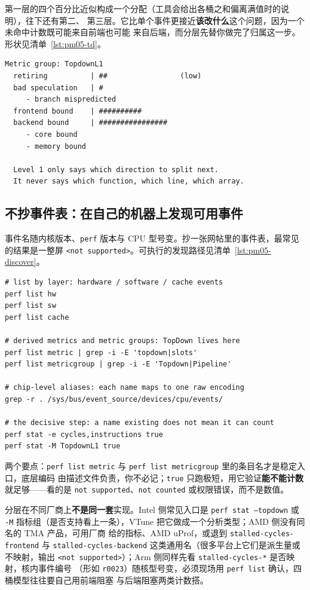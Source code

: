 \documentclass[12pt,a4paper,fontset=fandol]{ctexbook}
\newcommand{\Tp}[1]{\texttt{#1}}
\newcommand{\Bk}{\discretionary{}{}{}}
\begin{document}
第一层的四个百分比近似构成一个分配（工具会给出各桶之和偏离满值时的说明），往下还有第二、
第三层。它比单个事件更接近\textbf{该改什么}这个问题，因为一个未命中计数既可能来自前端也可能
来自后端，而分层先替你做完了归属这一步。形状见清单~\ref{lst:pm05-td}。

\begin{lstlisting}[style=outstyle, label={lst:pm05-td},
  caption={形态示意：TopDown 第一层的输出形状（非实测值，条形长度只表示相对高低）}]
  Metric group: TopdownL1
  retiring          | ##                 (low)
  bad speculation   | #
     - branch mispredicted
  frontend bound    | ##########
  backend bound     | ################
     - core bound
     - memory bound

  Level 1 only says which direction to split next.
  It never says which function, which line, which array.
\end{lstlisting}

\subsection*{不抄事件表：在自己的机器上发现可用事件}

事件名随内核版本、\Tp{perf} 版本与 CPU 型号变。抄一张网帖里的事件表，最常见的结果是一整屏
\Tp{<not supported>}。可执行的发现路径见清单~\ref{lst:pm05-discover}。

\begin{lstlisting}[style=shellstyle, label={lst:pm05-discover},
  title={事件与指标发现（Linux）}]
# list by layer: hardware / software / cache events
perf list hw
perf list sw
perf list cache

# derived metrics and metric groups: TopDown lives here
perf list metric | grep -i -E 'topdown|slots'
perf list metricgroup | grep -i -E 'Topdown|Pipeline'

# chip-level aliases: each name maps to one raw encoding
grep -r . /sys/bus/event_source/devices/cpu/events/

# the decisive step: a name existing does not mean it can count
perf stat -e cycles,instructions true
perf stat -M TopdownL1 true
\end{lstlisting}

两个要点：\Tp{perf list metric} 与 \Tp{perf list metricgroup} 里的条目名才是稳定入口，底层编码
由描述文件负责，你不必记；\Tp{true} 只跑极短，用它验证\textbf{能不能计数}就足够——看的是
\Tp{not supported}、\Tp{not counted} 或权限错误，而不是数值。

分层在不同厂商上\textbf{不是同一套}实现。Intel 侧常见入口是 \Tp{perf stat --topdown} 或 \Tp{-M}
指标组（是否支持看上一条），VTune 把它做成一个分析类型；AMD 侧没有同名的 TMA 产品，可用厂商
给的指标、AMD uProf，或退到 \Tp{stalled{\Bk}-cycles{\Bk}-frontend} 与
\Tp{stalled{\Bk}-cycles{\Bk}-backend} 这类通用名（很多平台上它们是派生量或不映射，输出
\Tp{<not supported>}）；Arm 侧同样先看 \Tp{stalled{\Bk}-cycles-*} 是否映射，核内事件编号
（形如 \Tp{r0023}）随核型号变，必须现场用 \Tp{perf list} 确认，四桶模型往往要自己用前端阻塞
与后端阻塞两类计数搭。
\end{document}
